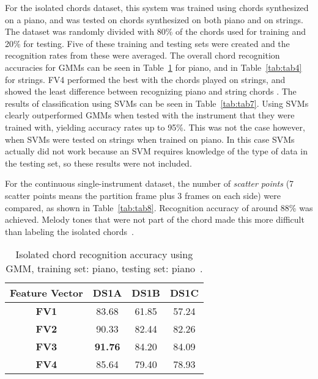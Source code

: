 \documentclass{sig-alternate}
\begin{document}
For the isolated chords dataset, this system was trained using chords synthesized on a piano, and was tested on chords synthesized on both piano and on strings. The dataset was randomly divided with 80\% of the chords used for training and 20\% for testing. Five of these training and testing sets were created and the recognition rates from these were averaged. The overall chord recognition accuracies for GMMs can be seen in Table~\ref{tab:tab3} for piano, and in Table~\ref{tab:tab4} for strings. FV4 performed the best with the chords played on strings, and showed the least difference between recognizing piano and string chords \cite{Morman:2006}. The results of classification using SVMs can be seen in Table~\ref{tab:tab7}. Using SVMs clearly outperformed GMMs when tested with the instrument that they were trained with, yielding accuracy rates up to 95\%. This was not the case however, when SVMs were tested on strings when trained on piano. In this case SVMs actually did not work because an SVM requires knowledge of the type of data in the testing set, so these results were not included.  

For the continuous single-instrument dataset, the number of \textit{scatter points} (7 scatter points means the partition frame plus 3 frames on each side) were compared, as shown in Table~\ref{tab:tab8}. Recognition accuracy of around 88\% was achieved. Melody tones that were not part of the chord made this more difficult than labeling the isolated chords~\cite{Morman:2006}. 



\begin{table}[h]
\centering
\begin{tabular}{|c|c|c|c|} \hline
\textbf{Feature Vector} & \textbf{DS1A} & \textbf{DS1B} & \textbf{DS1C} \\ \hline
\textbf{FV1} & 83.68 & 61.85 & 57.24 \\ \hline
\textbf{FV2} & 90.33 & 82.44 & 82.26 \\ \hline
\textbf{FV3} & \textbf{91.76} & 84.20 & 84.09 \\ \hline
\textbf{FV4} & 85.64 & 79.40 & 78.93 \\ \hline
\end{tabular}
\caption{Isolated chord recognition accuracy using GMM, training set: piano, testing set: piano~\cite{Morman:2006}.}
\label{tab:tab3}
\end{table} 
\end{document}
